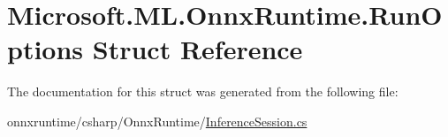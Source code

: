 \hypertarget{structMicrosoft_1_1ML_1_1OnnxRuntime_1_1RunOptions}{}\section{Microsoft.\+M\+L.\+Onnx\+Runtime.\+Run\+Options Struct Reference}
\label{structMicrosoft_1_1ML_1_1OnnxRuntime_1_1RunOptions}


The documentation for this struct was generated from the following file\+:\begin{DoxyCompactItemize}
\item 
onnxruntime/csharp/\+Onnx\+Runtime/\mbox{\hyperlink{OnnxRuntime_2InferenceSession_8cs}{Inference\+Session.\+cs}}\end{DoxyCompactItemize}
